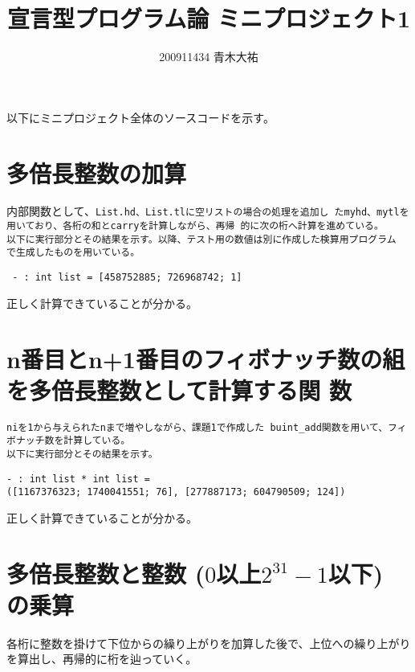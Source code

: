 \documentclass[a4paper,8pt]{jarticle}
\title{宣言型プログラム論 ミニプロジェクト1}
\author{200911434 青木大祐}
\begin{document}
\maketitle
\newpage
以下にミニプロジェクト全体のソースコードを示す。

\newpage
\section{多倍長整数の加算}
\begin{quote}

\end{quote}

内部関数として、\tt{List.hd}、\tt{List.tl}に空リストの場合の処理を追加し
た\tt{myhd}、\tt{mytl}を用いており、各桁の和とcarryを計算しながら、再帰
的に次の桁へ計算を進めている。\\


以下に実行部分とその結果を示す。以降、テスト用の数値は別に作成した検算用プログラム
で生成したものを用いている。



\begin{lstlisting}
 - : int list = [458752885; 726968742; 1]
\end{lstlisting}
正しく計算できていることが分かる。

\section{n番目とn+1番目のフィボナッチ数の組を多倍長整数として計算する関
 数}

\tt{ni}を1から与えられた\tt{n}まで増やしながら、課題1で作成した
\tt{buint\_add}関数を用いて、フィボナッチ数を計算している。\\

\newpage
以下に実行部分とその結果を示す。\\


\begin{lstlisting}
- : int list * int list =
([1167376323; 1740041551; 76], [277887173; 604790509; 124]) 
\end{lstlisting}
正しく計算できていることが分かる。

\section{多倍長整数と整数 ($0$以上$2^{31}-1$以下) の乗算}

各桁に整数を掛けて下位からの繰り上がりを加算した後で、上位への繰り上がり
を算出し、再帰的に桁を辿っていく。\\
\end{document}
